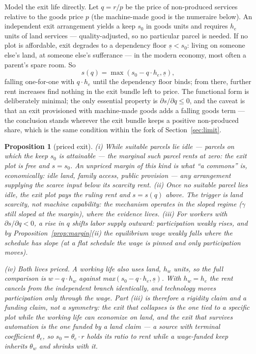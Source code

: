 \documentclass[12pt]{article}
\theoremstyle{plain}
\newtheorem{proposition}{Proposition}
\begin{document}
Model the exit life directly. Let $q = r/p$ be the price of non-produced services relative to the goods price $p$ (the machine-made good is the numeraire below). An independent exit arrangement yields a keep $s_0$ in goods units and requires $h_e$ units of land services --- quality-adjusted, so no particular parcel is needed. If no plot is affordable, exit degrades to a dependency floor $\underline{s} < s_0$: living on someone else's land, at someone else's sufferance --- in the modern economy, most often a parent's spare room. So
\begin{equation}\label{eq:exit}
s(q) = \max( s_0 - q\cdot h_e , \underline{s} ),
\end{equation}
falling one-for-one with $q\cdot h_e$ until the dependency floor binds; from there, further rent increases find nothing in the exit bundle left to price. The functional form is deliberately minimal; the only essential property is $\partial s/\partial q \le 0$, and the caveat is that an exit provisioned with machine-made goods adds a falling goods term --- the conclusion stands wherever the exit bundle keeps a positive non-produced share, which is the same condition within the fork of Section~\ref{sec:limit}.

\begin{proposition}[priced exit]\label{prop:exit}
(i) While suitable parcels lie idle --- parcels on which the keep $s_0$ is attainable --- the marginal such parcel rents at zero: the exit plot is free and $s = s_0$. An unpriced margin of this kind is what ``a commons'' is, economically: idle land, family access, public provision --- any arrangement supplying the scarce input below its scarcity rent. (ii) Once no suitable parcel lies idle, the exit plot pays the ruling rent and $s = s(q)$ above. The trigger is land scarcity, not machine capability: the mechanism operates in the sloped regime ($\gamma$ still sloped at the margin), where the evidence lives. (iii) For workers with $\partial s/\partial q < 0$, a rise in $q$ shifts labor supply outward: participation weakly rises, and by Proposition~\ref{prop:margin}(ii) the equilibrium wage weakly falls where the schedule has slope (at a flat schedule the wage is pinned and only participation moves).

(iv) \emph{Both lives priced.} A working life also uses land, $h_w$ units, so the full comparison is $w - q\cdot h_w$ against max$(s_0 - q\cdot h_e, \underline{s})$. With $h_w = h_e$ the rent cancels from the independent branch identically, and technology moves participation only through the wage. Part (iii) is therefore a rigidity claim and a funding claim, not a symmetry: the exit that collapses is the one tied to a specific plot while the working life can economize on land, and the exit that survives automation is the one funded by a land claim --- a source with terminal coefficient $\theta _e$, so $s_0 = \theta _e\cdot r$ holds its ratio to rent while a wage-funded keep inherits $\theta _w$ and shrinks with it.
\end{proposition}
\end{document}
